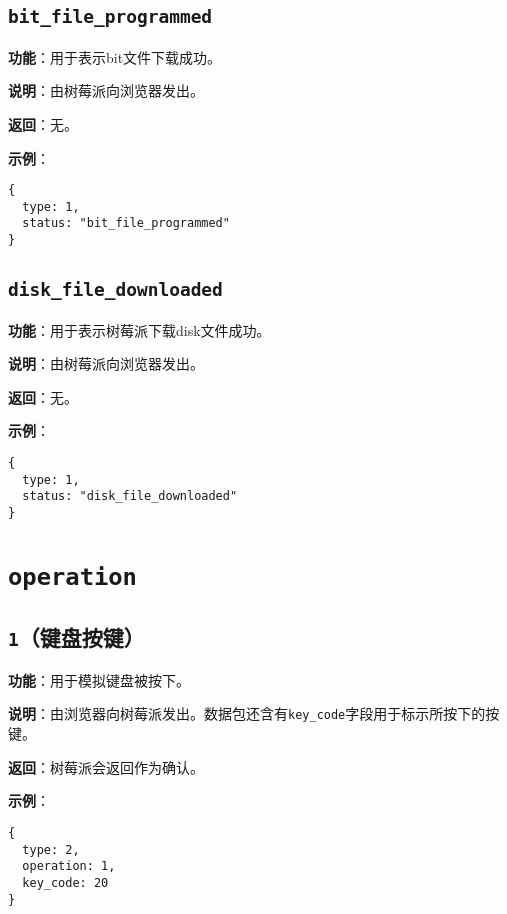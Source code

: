 \documentclass{article}
\begin{document}
\subsection{\texttt{bit\_file\_programmed}}
\label{status:bit_file_programmed}

\noindent\textbf{功能}：用于表示bit文件下载成功。

\noindent\textbf{说明}：由树莓派向浏览器发出。

\noindent\textbf{返回}：无。

\noindent\textbf{示例}：

\begin{lstlisting}[style=json]
{
  type: 1,
  status: "bit_file_programmed"
}
\end{lstlisting}

\subsection{\texttt{disk\_file\_downloaded}}
\label{status:disk_file_downloaded}

\noindent\textbf{功能}：用于表示树莓派下载disk文件成功。

\noindent\textbf{说明}：由树莓派向浏览器发出。

\noindent\textbf{返回}：无。

\noindent\textbf{示例}：

\begin{lstlisting}[style=json]
{
  type: 1,
  status: "disk_file_downloaded"
}
\end{lstlisting}

\section{\texttt{operation}}

\subsection{\texttt{1}（键盘按键）}
\label{op:key}

\noindent\textbf{功能}：用于模拟键盘被按下。

\noindent\textbf{说明}：由浏览器向树莓派发出。数据包还含有\texttt{key\_code}字段用于标示所按下的按键。

\noindent\textbf{返回}：树莓派会返回\texttt{}作为确认。

\noindent\textbf{示例}：

\begin{lstlisting}[style=json]
{
  type: 2,
  operation: 1,
  key_code: 20
}
\end{lstlisting}
\end{document}
